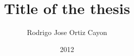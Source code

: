 \documentclass[11pt,a4paper,english,intoc,titlepage,fleqn]{book}
\let\myTOC\tableofcontents
\renewcommand\tableofcontents{%
  \frontmatter
  \pdfbookmark[1]{\contentsname}{}
  \myTOC
  \mainmatter }
\begin{document}
\title{Title of the thesis}
\author{Rodrigo Jose Ortiz Cayon}
\date{2012}


\thispagestyle{empty} 
\cleardoublepage

\normalfont 


\thispagestyle{empty}  
\cleardoublepage



\cleardoublepage{}


\thispagestyle{empty} 
\cleardoublepage{}

\pagestyle{fancy}

\lhead[\leftmark]{}	
\rhead[]{\leftmark}

\tableofcontents{} 
\cleardoublepage{}

\lhead[\chaptername~\thechapter]{\leftmark}	
\rhead[\leftmark]{\chaptername~\thechapter}


\cleardoublepage{}


\cleardoublepage{}


\cleardoublepage{}


\cleardoublepage{}


\cleardoublepage{}


\cleardoublepage{}

\appendix


\cleardoublepage{}


\cleardoublepage{}


\cleardoublepage{}



\end{document}
